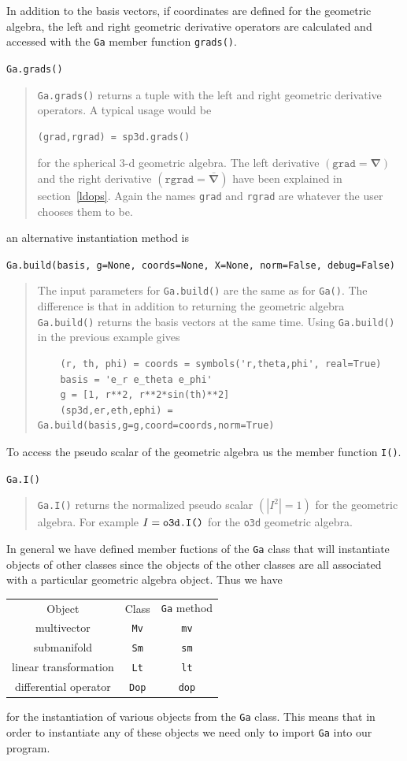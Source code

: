 \documentclass[12pt,twoside,openright]{memoir}
\newcommand{\bm}[1]{\boldsymbol{#1}}
\newcommand{\lp}{\left (}
\newcommand{\rp}{\right )}
\newcommand{\abs}[1]{\left |{#1}\right |}
\newcommand{\paren}[1]{\lp {#1} \rp}
\newcommand{\T}[1]{\texttt{#1}}
\begin{document}
In addition to the basis vectors, if coordinates are defined for the geometric algebra, the 
left and right geometric derivative operators are calculated and accessed with the \T{Ga} 
member function \T{grads()}.

\T{Ga.grads()}
\begin{quote}
	\T{Ga.grads()} returns a tuple with the left and right geometric derivative operators. A
	typical usage would be 
	\begin{lstlisting}[numbers=none]
	(grad,rgrad) = sp3d.grads()
   	\end{lstlisting}
   	for the spherical 3-d geometric algebra. The left derivative $\paren{\T{grad} =\bm{\nabla}}$ and the
   	right derivative $\paren{\T{rgrad} = \bm{\bar{\nabla}}}$ have been explained in section~\ref{ldops}. Again
   	the names \T{grad} and \T{rgrad} are whatever the user chooses them to be. 
\end{quote}

an alternative instantiation method is

\T{Ga.build(basis, g=None, coords=None, X=None, norm=False, debug=False)}
\begin{quote}
	The input parameters for \T{Ga.build()} are the same as for \T{Ga()}.  The difference is
	that in addition to returning the geometric algebra \T{Ga.build()} returns the basis vectors
	at the same time. Using \T{Ga.build()} in the previous example gives
   \begin{lstlisting}
   	(r, th, phi) = coords = symbols('r,theta,phi', real=True)
   	basis = 'e_r e_theta e_phi'
   	g = [1, r**2, r**2*sin(th)**2]
   	(sp3d,er,eth,ephi) = Ga.build(basis,g=g,coord=coords,norm=True)	
	\end{lstlisting}
\end{quote}

To access the pseudo scalar of the geometric algebra us the member function \T{I()}.

\T{Ga.I()}
\begin{quote}
	\T{Ga.I()} returns the normalized pseudo scalar $\paren{\abs{I^{2}}=1}$ for the 
	geometric algebra. For example $I = \mbox{\T{o3d.I()}}$ for the \T{o3d} geometric 
	algebra.
\end{quote}

In general we have defined member fuctions of the \T{Ga} class that will instantiate objects
of other classes since the objects of the other classes are all associated with a particular
geometric algebra object.  Thus we have
\begin{center}
\begin{tabular}{ccc}
	Object &  Class & \T{Ga} method \\
	multivector & \T{Mv} & \T{mv} \\
	submanifold & \T{Sm} & \T{sm} \\
	linear transformation & \T{Lt} & \T{lt} \\
	differential operator & \T{Dop} & \T{dop}
\end{tabular}
\end{center}
for the instantiation of various objects from the \T{Ga} class.  This means that in order to 
instantiate any of these objects we need only to import \T{Ga} into our program.
\end{document}
